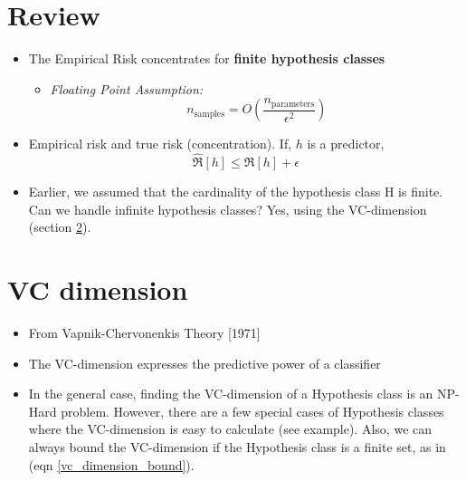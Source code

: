 \documentclass[12pt]{report}
\begin{document}

\def \Expec{\mathbb E}
\def \Prob{\mathbb P}
\def \Risk{\mathfrak R}
\def \NormD{\mathcal N}
\def \HypClass{\mathcal H}
\def \TODO{\textbf{\textcolor{red}{TODO: }}}

\maketitle

\vspace*{.1in}
\section{Review}

\begin{itemize}
\item The Empirical Risk concentrates for \textbf{finite hypothesis classes}
\begin{itemize}
\item \textit{Floating Point Assumption:}
\begin{equation}
n_{\text{samples}} = O\left(\frac{n_{\text{parameters}}}{\epsilon^2}\right)
\end{equation}
\end{itemize}
\item Empirical risk and true risk (concentration). If, $h$ is a predictor,
\begin{equation}
\hat{\Risk}[h] \le \Risk[h] + \epsilon
\end{equation}
\item Earlier, we assumed that the cardinality of the hypothesis class H is finite. Can we handle infinite hypothesis classes? Yes, using the VC-dimension (section \ref{vc_dimension}).
\end{itemize}

\section{VC dimension} \label{vc_dimension}

\begin{itemize}
\item From Vapnik-Chervonenkis Theory [1971]
\item The VC-dimension expresses the predictive power of a classifier
\item In the general case, finding the VC-dimension of a Hypothesis class is an NP-Hard problem. However, there are a few special cases of Hypothesis classes where the VC-dimension is easy to calculate (see example). Also, we can always bound the VC-dimension if the Hypothesis class is a finite set, as in (eqn \ref{vc_dimension_bound}).
\end{itemize}
\end{document}
